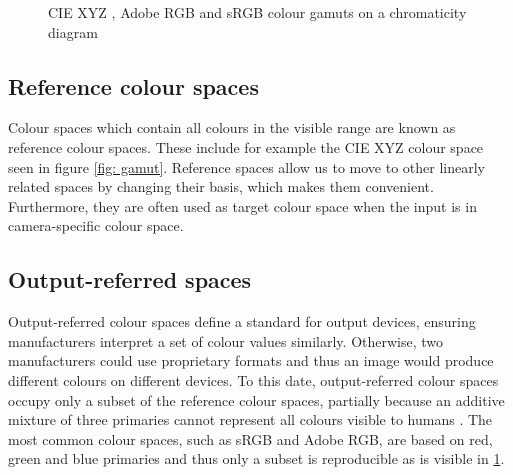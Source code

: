 \begin{figure}
    \centering
    \caption{CIE XYZ \cite{cie1931}, Adobe RGB \cite{adobeRGB} and sRGB \cite{sRGB} colour gamuts on a chromaticity diagram}
    \label{fig:gamut}
\end{figure}


\subsection{Reference colour spaces}

Colour spaces which contain all colours in the visible range are known as reference colour spaces. These include 
for example the CIE XYZ colour space seen in figure \ref{fig: gamut}. Reference spaces allow us to move to other linearly related spaces by changing their basis, which makes them convenient. Furthermore, they are often used as target colour space when the input is in camera-specific colour space. \cite[224-225]{rowlands2020physics}


\subsection{Output-referred spaces}

Output-referred colour spaces define a standard for output devices, ensuring manufacturers interpret a set of colour values similarly. Otherwise, two manufacturers could use proprietary formats and thus an image would produce different colours on different devices. To this date, output-referred colour spaces occupy only a subset of the reference colour spaces, partially because an additive mixture of three primaries cannot represent all colours visible to humans \cite[65]{colorimetry}. The most common colour spaces, such as sRGB and Adobe RGB, are based on red, green and blue primaries and thus only a subset is reproducible as is visible in \ref{fig:gamut}.

